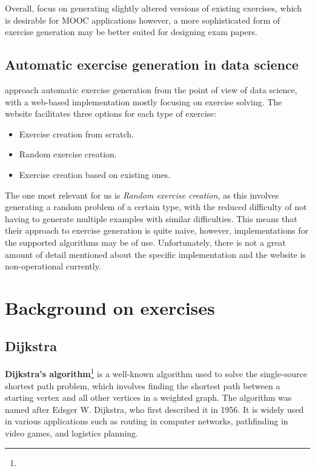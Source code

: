 \documentclass{l4proj}
\begin{document}
Overall, \citet{Sad12} focus on generating slightly altered versions of existing exercises, which is desirable for MOOC applications however, a more sophisticated form of exercise generation may be better suited for designing exam papers.

\subsection{Automatic exercise generation in data science}
\citet{Kot19} approach automatic exercise generation from the point of view of data science, with a web-based implementation mostly focusing on exercise solving. The website facilitates three options for each type of exercise: 

\begin{itemize}
	\item
	Exercise creation from scratch. 
	\item
	Random exercise creation. 
	\item
	Exercise creation based on existing ones. 
\end{itemize}

The one most relevant for us is \emph{Random exercise creation}, as this involves generating a random problem of a certain type, with the reduced difficulty of not having to generate multiple examples with similar difficulties. This means that their approach to exercise generation is quite naive, however, implementations for the supported algorithms may be of use. Unfortunately, there is not a great amount of detail mentioned about the specific implementation and the website is non-operational currently.

\section{Background on exercises}
\subsection{Dijkstra}

\textbf{Dijkstra's algorithm}\footnote{} is a well-known algorithm used to solve the single-source shortest path problem, which involves finding the shortest path between a starting vertex and all other vertices in a weighted graph. The algorithm was named after Edsger W. Dijkstra, who first described it in 1956. It is widely used in various applications such as routing in computer networks, pathfinding in video games, and logistics planning.
\end{document}
